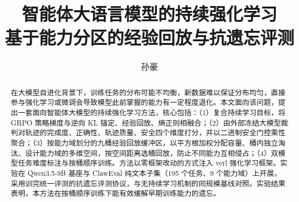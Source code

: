 \documentclass[11pt]{article}
\title{智能体大语言模型的持续强化学习\\
       \large 基于能力分区的经验回放与抗遗忘评测}
\author{孙豪}
\date{}
\begin{document}
\maketitle

\begin{abstract}
在大模型自进化背景下，训练任务的分布可能不均衡，新数据难以保证分布均匀，直接参与强化学习或微调会导致模型此前掌握的能力有一定程度退化。本文面向该问题，提出一套面向智能体大模型的持续强化学习方法，核心包括：（1）复合持续学习目标，将 GRPO 策略梯度与逆向 KL 锚定、经验回放、熵正则相融合；（2）由外部冻结大模型裁判对轨迹的完成度、正确性、轨迹质量、安全四个维度打分，并以二进制安全门控乘性聚合；（3）按能力域划分的九桶经验回放缓冲区，以平方根加权分配容量、桶内独立淘汰、设计能力域的多维空间，按空间距离选桶回放，防止不同能力互相侵占；（4）双模型任务难度标注与按桶顺序训练。方法以零框架改动的方式注入 verl 强化学习框架。实验在 Qwen3.5-9B 基座与 ClawEval 纯文本子集（195 个任务、9 个能力域）上开展，采用训完统一评测的抗遗忘评测协议，与无持续学习机制的同规模基线对照。实验结果表明，本方法在按桶顺序训练下能有效缓解早期训练能力的遗忘。
\end{abstract}








\appendix

\end{document}
